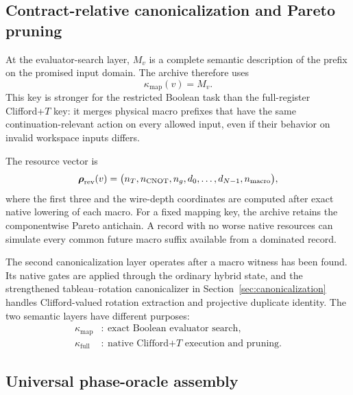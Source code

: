 \subsection{Contract-relative canonicalization and Pareto pruning}

At the evaluator-search layer, $M_v$ is a complete semantic description of the prefix on the promised input domain.  The archive therefore uses
\begin{equation}
\kappa_{\mathrm{map}}(v)=M_v.
\label{eq:mapping-canonical-key}
\end{equation}
This key is stronger for the restricted Boolean task than the full-register Clifford+$T$ key: it merges physical macro prefixes that have the same continuation-relevant action on every allowed input, even if their behavior on invalid workspace inputs differs.

The resource vector is
\begin{equation}
\boldsymbol{\rho}_{\mathrm{rev}}(v)=
\bigl(n_T,n_{\operatorname{CNOT}},n_g,d_0,\ldots,d_{N-1},n_{\mathrm{macro}}\bigr),
\label{eq:macro-resources}
\end{equation}
where the first three and the wire-depth coordinates are computed after exact native lowering of each macro.  For a fixed mapping key, the archive retains the componentwise Pareto antichain.  A record with no worse native resources can simulate every common future macro suffix available from a dominated record.

The second canonicalization layer operates after a macro witness has been found.  Its native gates are applied through the ordinary hybrid state, and the strengthened tableau--rotation canonicalizer in Section~\ref{sec:canonicalization} handles Clifford-valued rotation extraction and projective duplicate identity.  The two semantic layers have different purposes:
\begin{equation}
\begin{aligned}
\kappa_{\mathrm{map}}&:\ \text{exact Boolean evaluator search},\\
\kappa_{\mathrm{full}}&:\ \text{native Clifford+$T$ execution and pruning}.
\end{aligned}
\end{equation}

\subsection{Universal phase-oracle assembly}

